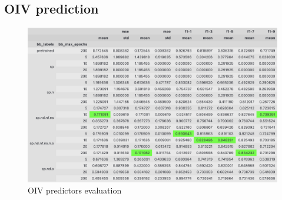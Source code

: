 \documentclass[english]{article}
\begin{document}
\subsection{OIV prediction}

\begin{figure}[H]
    \centering
    \includegraphics[width=0.9\linewidth]{p_viticola//resources//images/oivresult.png}
    \caption{OIV predictors evaluation}
    \label{fig:oivresultstable}
\end{figure}
\end{document}
